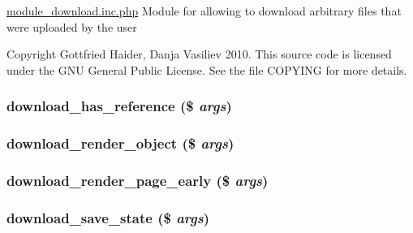 \hyperlink{module__download_8inc_8php}{module\_\-download.inc.php} Module for allowing to download arbitrary files that were uploaded by the user

Copyright Gottfried Haider, Danja Vasiliev 2010. This source code is licensed under the GNU General Public License. See the file COPYING for more details. \hypertarget{module__download_8inc_8php_a80da3f3fd41f7f00f97043f7a2431c8}{
\subsubsection[{download\_\-has\_\-reference}]{\setlength{\rightskip}{0pt plus 5cm}download\_\-has\_\-reference (\$ {\em args})}}
\label{module__download_8inc_8php_a80da3f3fd41f7f00f97043f7a2431c8}


\hypertarget{module__download_8inc_8php_57c588f1fd0663aa16fd707a522bcc79}{
\subsubsection[{download\_\-render\_\-object}]{\setlength{\rightskip}{0pt plus 5cm}download\_\-render\_\-object (\$ {\em args})}}
\label{module__download_8inc_8php_57c588f1fd0663aa16fd707a522bcc79}


\hypertarget{module__download_8inc_8php_c980246bec838c65efd59bc25253b005}{
\subsubsection[{download\_\-render\_\-page\_\-early}]{\setlength{\rightskip}{0pt plus 5cm}download\_\-render\_\-page\_\-early (\$ {\em args})}}
\label{module__download_8inc_8php_c980246bec838c65efd59bc25253b005}


\hypertarget{module__download_8inc_8php_2e9ee6868b80832b40e9072a8c644c88}{
\subsubsection[{download\_\-save\_\-state}]{\setlength{\rightskip}{0pt plus 5cm}download\_\-save\_\-state (\$ {\em args})}}
\label{module__download_8inc_8php_2e9ee6868b80832b40e9072a8c644c88}


